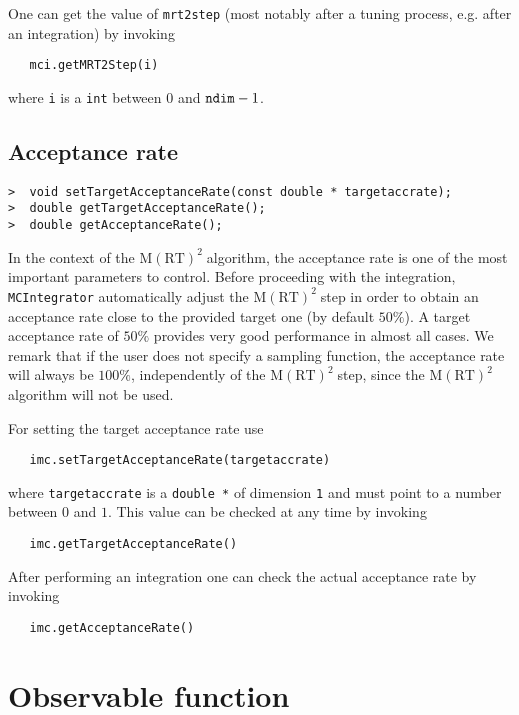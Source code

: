 \documentclass[11pt,a4paper,twoside]{article}
\newcommand{\MRTWO}{$ \text{M}(\text{RT})^2 \;$}
\begin{document}
One can get the value of \verb+mrt2step+ (most notably after a tuning process, e.g. after an integration) by invoking
\begin{verbatim}
   mci.getMRT2Step(i)
\end{verbatim}
where \verb+i+ is a \verb+int+ between $0$ and $\verb+ndim+-1$.



\subsection{Acceptance rate} %
\label{sub:acceptance_rate}

\begin{verbatim}
>  void setTargetAcceptanceRate(const double * targetaccrate);   
>  double getTargetAcceptanceRate();
>  double getAcceptanceRate();
\end{verbatim}

In the context of the \MRTWO algorithm, the acceptance rate is one of the most important parameters to control.
Before proceeding with the integration, \verb+MCIntegrator+ automatically adjust the \MRTWO step in order to obtain an acceptance rate close to the provided target one (by default $50\%$).
A target acceptance rate of $50\%$ provides very good performance in almost all cases.
We remark that if the user does not specify a sampling function, the acceptance rate will always be $100\%$, independently of the \MRTWO step, since the \MRTWO algorithm will not be used.

For setting the target acceptance rate use
\begin{verbatim}
   imc.setTargetAcceptanceRate(targetaccrate)
\end{verbatim}
where \verb+targetaccrate+ is a \verb+double *+ of dimension \verb+1+ and must point to a number between $0$ and $1$.
This value can be checked at any time by invoking
\begin{verbatim}
   imc.getTargetAcceptanceRate()
\end{verbatim}

After performing an integration one can check the actual acceptance rate by invoking
\begin{verbatim}
   imc.getAcceptanceRate()
\end{verbatim}


\section{Observable function} %
\label{sec:observable_function}
\end{document}
